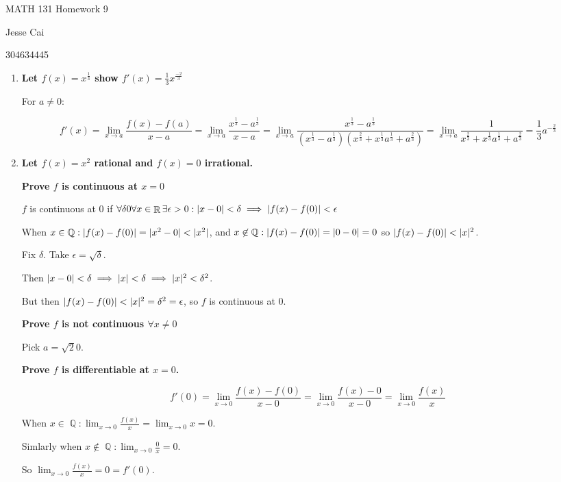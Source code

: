 \documentclass[10pt,a4paper]{article}
\DeclareMathOperator*{\R}{\mathbb{R}}
\DeclareMathOperator*{\Q}{\mathbb{Q}}
\DeclarePairedDelimiter{\abs}{\lvert}{\rvert}
\begin{document}
 
MATH 131 Homework 9

Jesse Cai

304634445

\begin{enumerate}
    \item \textbf{Let $f(x) = x^{\frac{1}{3}}$ show $f'(x) = \frac{1}{3}x^\frac{-2}{3}$}

        For $a \neq 0$:

        $$f'(x) = \lim_{x \to a} \frac{f(x) - f(a)}{x - a } =\lim_{x \to a} \frac{x^{\frac{1}{3}} - a^{\frac{1}{3}}}{x - a} = \lim_{x \to a} \frac{x^{\frac{1}{3}} - a^{\frac{1}{3}}}{(x^{\frac{1}{3}} - a^{\frac{1}{3}})(x^{\frac{2}{3}} + x^{\frac{1}{3}}a^{\frac{1}{3}} + a^{\frac{2}{3}})} = \lim_{x \to a} \frac{1}{x^{\frac{2}{3}} + x^{\frac{1}{3}}a^{\frac{1}{3}} + a^{\frac{2}{3}}} =  \frac{1}{3}a^{-\frac{2}{3}}$$

    \item \textbf{Let $f(x)=x^2$ rational and $f(x)=0$ irrational.}
        
    \textbf{ Prove $f$ is continuous at $x = 0$}

        $f$ is continuous at $0$ if $\forall \delta 0 \forall x \in \R \exists \epsilon> 0: \abs{x - 0 }< \delta \implies \abs{f(x) -f(0)} <\epsilon$

        When $x \in \Q: \abs{f(x) -f(0)} = \abs{x^2 -0} < \abs{x^2}$, and $x \not \in \Q: \abs{f(x) -f(0)} = \abs{0 - 0} = 0 $ so $\abs{f(x)-f(0)} < \abs{x}^2$.

        Fix $\delta$. Take $\epsilon = \sqrt\delta$. 

        Then $\abs{x-0} < \delta \implies \abs{x} < \delta \implies \abs{x}^2 < \delta^2$.

        But then $\abs{f(x)-f(0)} < \abs{x}^2 = \delta^2 =  \epsilon$, so $f$ is continuous at 0.
    
    \textbf{ Prove $f$ is not continuous $\forall x \neq 0$}

        Pick $a = \sqrt 20$.

    \textbf{ Prove $f$ is differentiable at $x = 0$.}

        $$f'(0)= \lim_{x \to 0} \frac{f(x) - f(0)}{x - 0 } = \lim_{x \to 0} \frac{f(x) - 0}{x - 0 } = \lim_{x \to 0} \frac{f(x)}{x}$$

        When $x \in \Q: \lim_{x\to 0} \frac{f(x)}{x} = \lim_{x \to 0} x = 0$.

        Simlarly when $x \not \in \Q: \lim_{x\to 0} \frac{0}{x} = 0$.

        So $\lim_{x \to 0} \frac{f(x)}{x} = 0 = f'(0)$.
    

\end{enumerate}
\end{document}
